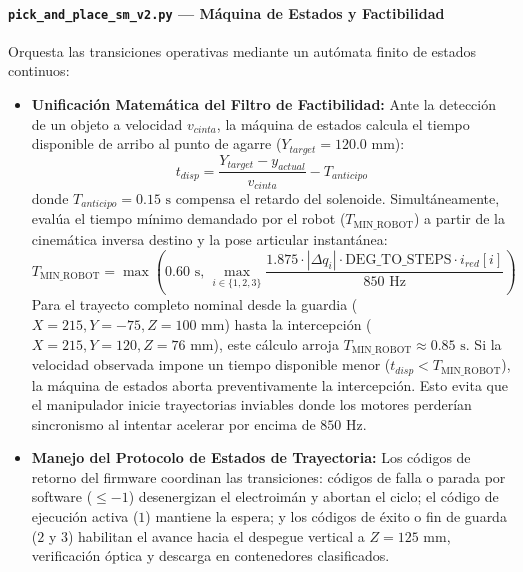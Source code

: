 \documentclass[12pt, a4paper]{report}
\begin{document}
\paragraph{\texttt{pick\_and\_place\_sm\_v2.py} --- Máquina de Estados y Factibilidad}
Orquesta las transiciones operativas mediante un autómata finito de estados continuos:
\begin{itemize}
    \item \textbf{Unificación Matemática del Filtro de Factibilidad:} 
    Ante la detección de un objeto a velocidad $v_{cinta}$, la máquina de estados calcula el tiempo disponible de arribo al punto de agarre ($Y_{target} = 120.0\text{ mm}$):
    \begin{equation}
        t_{disp} = \frac{Y_{target} - y_{actual}}{v_{cinta}} - T_{anticipo}
    \end{equation}
    donde $T_{anticipo} = 0.15\text{ s}$ compensa el retardo del solenoide. Simultáneamente, evalúa el tiempo mínimo demandado por el robot ($T_{\text{MIN\_ROBOT}}$) a partir de la cinemática inversa destino y la pose articular instantánea:
    \begin{equation}
        T_{\text{MIN\_ROBOT}} = \max\left(0.60\text{ s}, \, \max_{i \in \{1,2,3\}} \frac{1.875 \cdot |\Delta q_i| \cdot \text{DEG\_TO\_STEPS} \cdot i_{red}[i]}{850\text{ Hz}}\right)
    \end{equation}
    Para el trayecto completo nominal desde la guardia ($X=215, Y=-75, Z=100\text{ mm}$) hasta la intercepción ($X=215, Y=120, Z=76\text{ mm}$), este cálculo arroja $T_{\text{MIN\_ROBOT}} \approx 0.85\text{ s}$. Si la velocidad observada impone un tiempo disponible menor ($t_{disp} < T_{\text{MIN\_ROBOT}}$), la máquina de estados aborta preventivamente la intercepción. Esto evita que el manipulador inicie trayectorias inviables donde los motores perderían sincronismo al intentar acelerar por encima de $850\text{ Hz}$.
    
    \item \textbf{Manejo del Protocolo de Estados de Trayectoria:}
    Los códigos de retorno del firmware coordinan las transiciones: códigos de falla o parada por software ($\le -1$) desenergizan el electroimán y abortan el ciclo; el código de ejecución activa ($1$) mantiene la espera; y los códigos de éxito o fin de guarda ($2$ y $3$) habilitan el avance hacia el despegue vertical a $Z = 125\text{ mm}$, verificación óptica y descarga en contenedores clasificados.
\end{itemize}
\end{document}
